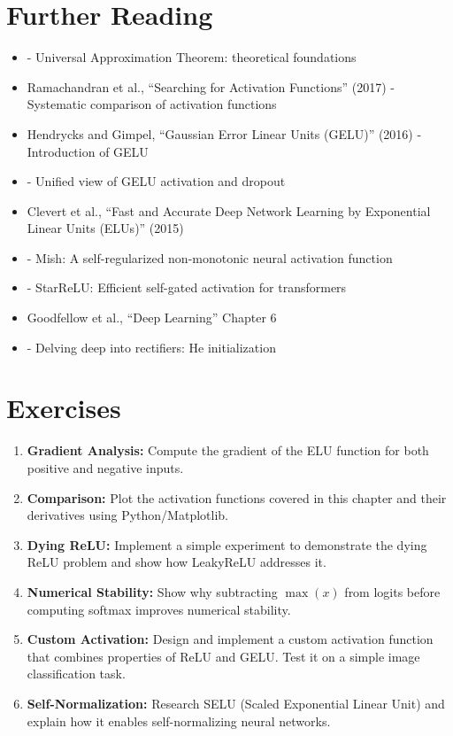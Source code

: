 \section{Further Reading}

\begin{itemize}
    \item \cite{hornik1991approximation} - Universal Approximation Theorem: theoretical foundations
    \item Ramachandran et al., ``Searching for Activation Functions'' (2017) - Systematic comparison of activation functions
    \item Hendrycks and Gimpel, ``Gaussian Error Linear Units (GELU)'' (2016) - Introduction of GELU
    \item \cite{clark2022unified} - Unified view of GELU activation and dropout
    \item Clevert et al., ``Fast and Accurate Deep Network Learning by Exponential Linear Units (ELUs)'' (2015)
    \item \cite{misra2019mish} - Mish: A self-regularized non-monotonic neural activation function
    \item \cite{maulik2024starrelu} - StarReLU: Efficient self-gated activation for transformers
    \item Goodfellow et al., ``Deep Learning'' Chapter 6
    \item \cite{he2015delving} - Delving deep into rectifiers: He initialization
\end{itemize}

\section{Exercises}

\begin{enumerate}
    \item \textbf{Gradient Analysis:} Compute the gradient of the ELU function for both positive and negative inputs.
    
    \item \textbf{Comparison:} Plot the activation functions covered in this chapter and their derivatives using Python/Matplotlib.
    
    \item \textbf{Dying ReLU:} Implement a simple experiment to demonstrate the dying ReLU problem and show how LeakyReLU addresses it.
    
    \item \textbf{Numerical Stability:} Show why subtracting $\max(x)$ from logits before computing softmax improves numerical stability.
    
    \item \textbf{Custom Activation:} Design and implement a custom activation function that combines properties of ReLU and GELU. Test it on a simple image classification task.
    
    \item \textbf{Self-Normalization:} Research SELU (Scaled Exponential Linear Unit) and explain how it enables self-normalizing neural networks.
\end{enumerate}
